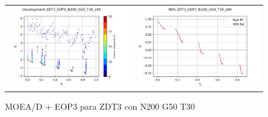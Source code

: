 \begin{figure}[H]
\begin{tabular}{c c}
    \includegraphics[scale=0.5]{figures/ZDT3_EOP3_N200_G50_T30/s99_dev.png} &
    \includegraphics[scale=0.5]{figures/ZDT3_EOP3_N200_G50_T30/s99_nds.png}\\
    \end{tabular}
    \caption{MOEA/D + EOP3 para ZDT3 con N200 G50 T30 }
    \label{fig:6}
\end{figure}

